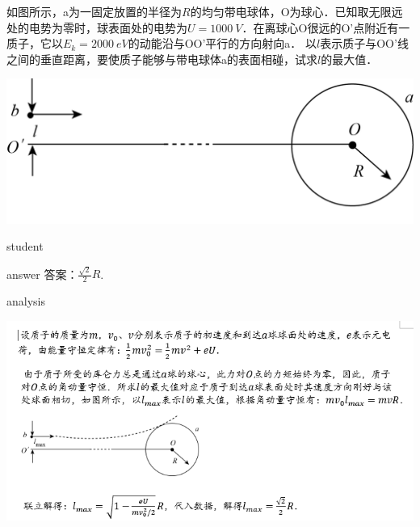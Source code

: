 \begin{example}
	 如图所示，a为一固定放置的半径为$ R $的均匀带电球体，O为球心．已知取无限远处的电势为零时，球表面处的电势为$ U = 1000~\si{V} $．在离球心O很远的O'点附近有一质子，它以$ E_k = 2000~\si{eV} $的动能沿与OO'平行的方向射向a．
	 以$ l $表示质子与OO'线之间的垂直距离，要使质子能够与带电球体a的表面相碰，试求$ l $的最大值．
	\begin{center}
\includegraphics[width=0.4\linewidth]{image/am-9}
\end{center}

	\begin{taggedblock}{student}
		\vspace*{2cm}
	\end{taggedblock}
	
	
	\begin{taggedblock}{answer}
		答案：$ \frac{\sqrt{2}}{2}R $.
	\end{taggedblock}
	
	
	\begin{taggedblock}{analysis}
\begin{center}
\includegraphics[width=0.9\linewidth]{image/am-10}
\end{center}

	\end{taggedblock}
\end{example}


